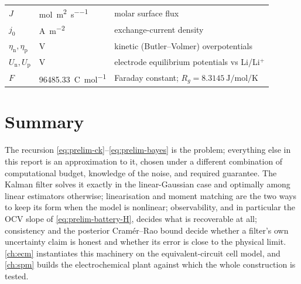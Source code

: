 \begin{longtable}{@{}llp{78mm}@{}}
$J$ & \si{\mole\per\square\metre\per\second} & molar surface flux \\
$j_0$ & \si{\ampere\per\square\metre} & exchange-current density \\
$\eta_{\mathrm{n}},\eta_{\mathrm{p}}$ & \si{\volt} & kinetic (Butler--Volmer) overpotentials \\
$U_{\mathrm{n}},U_{\mathrm{p}}$ & \si{\volt} & electrode equilibrium potentials vs Li/Li$^+$ \\
$F$ & \SI{96485.33}{\coulomb\per\mole} & Faraday constant; $R_g=\SI{8.3145}{\joule\per\mole\per\kelvin}$ \\
\end{longtable}

\section{Summary}

The recursion \eqref{eq:prelim-ck}--\eqref{eq:prelim-bayes} is the problem; everything else in
this report is an approximation to it, chosen under a different combination of computational
budget, knowledge of the noise, and required guarantee. The Kalman filter solves it exactly in
the linear-Gaussian case and optimally among linear estimators otherwise; linearisation and
moment matching are the two ways to keep its form when the model is nonlinear; observability, and
in particular the OCV slope of \eqref{eq:prelim-battery-H}, decides what is recoverable at all;
consistency and the posterior Cram\'er--Rao bound decide whether a filter's own uncertainty claim
is honest and whether its error is close to the physical limit. \cref{ch:ecm} instantiates this
machinery on the equivalent-circuit cell model, and \cref{ch:spm} builds the electrochemical
plant against which the whole construction is tested.
